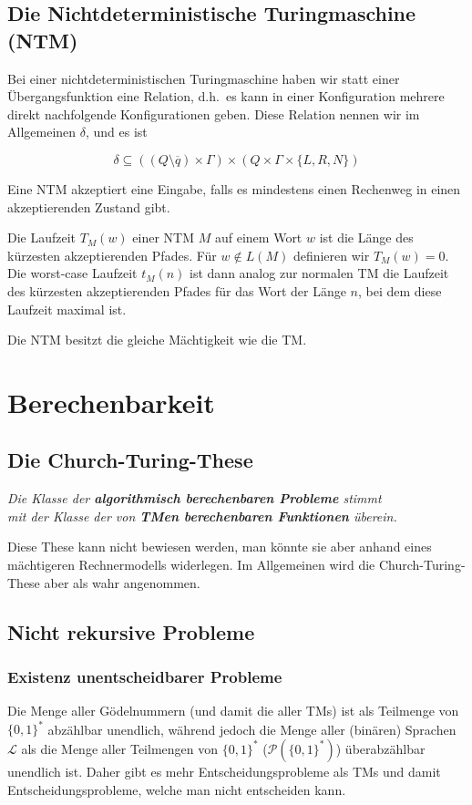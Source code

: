 \documentclass[a4paper,parskip=half*,DIV=7,fontsize=11pt]{scrartcl}
\begin{document}
\subsection{Die Nichtdeterministische Turingmaschine (NTM)}
Bei einer nichtdeterministischen Turingmaschine haben wir statt einer Übergangsfunktion eine Relation, d.h.\ es kann in einer Konfiguration mehrere direkt nachfolgende Konfigurationen geben. Diese Relation nennen wir im Allgemeinen $\delta$, und es ist

\[\delta \subseteq ((Q \setminus \overline q) \times \Gamma) \times (Q\times \Gamma \times \{L,R,N\})\]

Eine NTM akzeptiert eine Eingabe, falls es mindestens einen Rechenweg in einen akzeptierenden Zustand gibt.

Die Laufzeit $T_M(w)$ einer NTM $M$ auf einem Wort $w$ ist die Länge des kürzesten akzeptierenden Pfades. Für $w \notin L(M)$ definieren wir $T_M(w) = 0$. Die worst-case Laufzeit $t_M(n)$ ist dann analog zur normalen TM die Laufzeit des kürzesten akzeptierenden Pfades für das Wort der Länge $n$, bei dem diese Laufzeit maximal ist.

Die NTM  besitzt die gleiche Mächtigkeit wie die TM.

\section{Berechenbarkeit}
\subsection{Die Church-Turing-These}
\label{sec:church-turing}
\begin{center}
\textit{Die Klasse der \textbf{algorithmisch berechenbaren Probleme} stimmt \\ mit der Klasse der von \textbf{TMen berechenbaren Funktionen} überein.} 
\end{center} 
Diese These kann nicht bewiesen werden, man könnte sie aber anhand eines mächtigeren Rechnermodells widerlegen. Im Allgemeinen wird die Church-Turing-These aber als wahr angenommen.

\subsection{Nicht rekursive Probleme}
\subsubsection{Existenz unentscheidbarer Probleme}
Die Menge aller Gödelnummern (und damit die aller TMs) ist als Teilmenge von $\{0,1\}^*$ abzählbar unendlich, während jedoch die Menge aller (binären) Sprachen $\mathcal L$ als die Menge aller Teilmengen von $\{0,1\}^*$ ($\mathcal P (\{0,1\}^*)$)  überabzählbar unendlich ist. Daher gibt es  mehr Entscheidungsprobleme als TMs und damit Entscheidungsprobleme, welche man nicht entscheiden kann.
\end{document}

